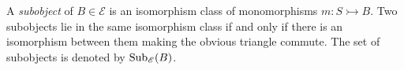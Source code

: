 

\begin{definition}
\label{def:subobject}
A \emph{subobject}  of $B \in \mathscr{E}$ is an isomorphism class of monomorphisms $m : S \rightarrowtail B$. Two subobjects lie in the same isomorphism class if and only if there is an isomorphism between them making the obvious triangle commute. The set of subobjects is denoted by $\operatorname{Sub}_{\mathscr{E}}(B)$.
\end{definition}

